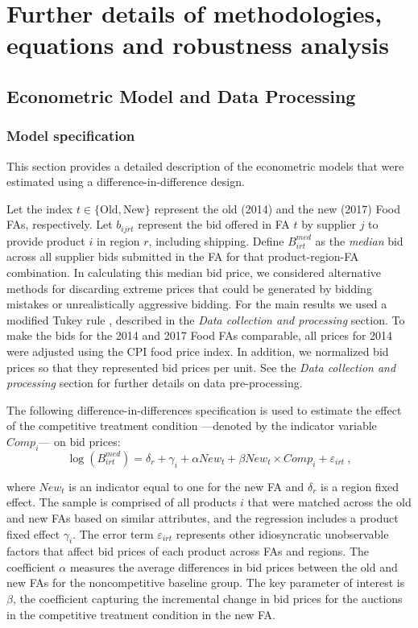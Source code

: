 \newpage

\appendix

\chapter{Further details of methodologies, equations and robustness analysis}

\section{Econometric Model and Data Processing} \label{app:data}

\subsection{Model specification}
This section provides a detailed description of the econometric models that were estimated using a difference-in-difference design.

Let the index $t\in\{\text{Old},\text{New}\}$ represent the old (2014) and the new (2017) Food FAs, respectively.  Let $b_{ijrt}$ represent the bid offered in FA $t$ by supplier $j$ to provide product $i$ in region $r$, including shipping.  Define $B^{med}_{irt}$ as the \textit{median} bid across all supplier bids submitted in the FA for that product-region-FA combination. In calculating this median bid price, we considered alternative methods for discarding extreme prices that could be generated by bidding mistakes or unrealistically aggressive bidding. For the main results we used a modified Tukey rule \citep{Tukey1977}, described in the \textit{Data collection and processing} section. To make the bids for the 2014 and 2017 Food FAs comparable, all prices for 2014 were adjusted using the CPI food price index. In addition, we normalized bid prices so that they represented bid prices per unit. See the \textit{Data collection and processing} section for further details on data pre-processing. 

The following difference-in-differences specification is used to estimate the effect of the competitive treatment condition ---denoted by the indicator variable $Comp_{i}$--- on bid prices:
\begin{equation}
    \log (B^{med}_{irt}) = \delta_r + \gamma_i + \alpha New_{t} + \beta New_{t}\times Comp_{i} + \varepsilon_{irt} \ ,
    \label{eq:reg_sub_bid}
\end{equation}

\noindent where $New_t$ is an indicator equal to one for the new FA and $\delta_r$ is a region fixed effect. The sample is comprised of all products $i$ that were matched across the old and new FAs based on similar attributes, and the regression includes a product fixed effect $\gamma_i$. {The error term $\varepsilon_{irt}$ represents other idiosyncratic unobservable factors that affect bid prices of each product across FAs and  regions.} The coefficient $\alpha$ measures the average differences in bid prices between the old and new FAs for the noncompetitive baseline group. The key parameter of interest is $\beta$, the coefficient capturing the incremental change in bid prices for the auctions in the competitive treatment condition in the new FA.

